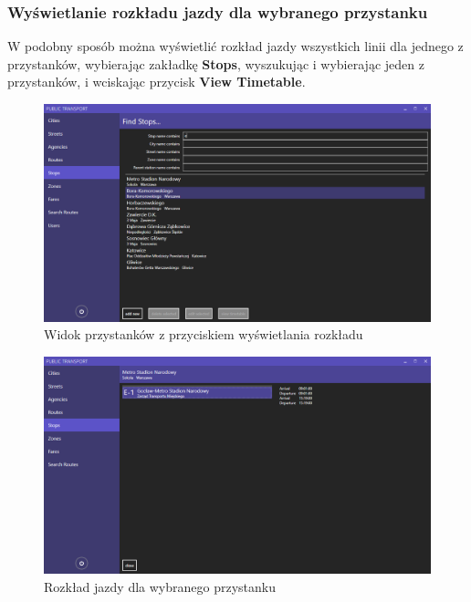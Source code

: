 \documentclass[10pt,a4paper]{article}
\begin{document}
\subsubsection{Wyświetlanie rozkładu jazdy dla wybranego przystanku}
W podobny sposób można wyświetlić rozkład jazdy wszystkich linii dla jednego z przystanków, wybierając zakładkę \textbf{Stops}, wyszukując i wybierając jeden z przystanków, i wciskając przycisk \textbf{View Timetable}.
\begin{figure}[H]
	\centering
	\includegraphics[width=15cm]{screenshots/13_filter_stops.png}
	\caption{Widok przystanków z przyciskiem wyświetlania rozkładu}
\end{figure}
\begin{figure}[H]
	\centering
	\includegraphics[width=15cm]{screenshots/22_stop_timetable.PNG}
	\caption{Rozkład jazdy dla wybranego przystanku}
\end{figure}
\end{document}
